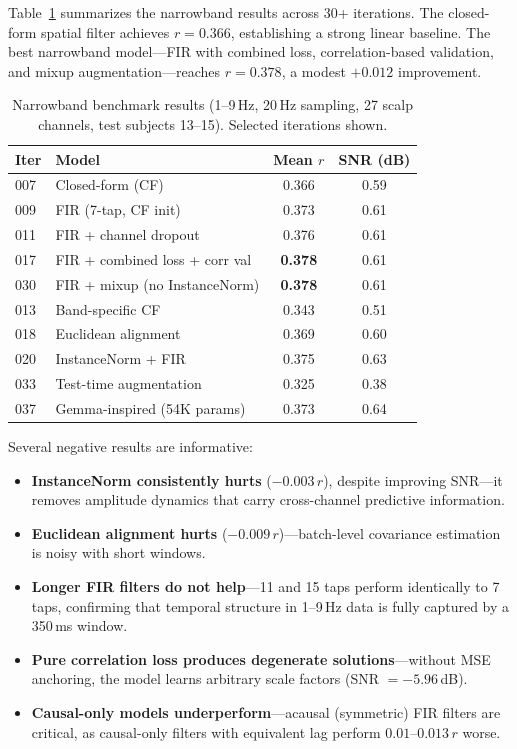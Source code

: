 \documentclass[conference]{IEEEtran}
\begin{document}
Table~\ref{tab:narrowband} summarizes the narrowband results across 30+ iterations. The closed-form spatial filter achieves $r = 0.366$, establishing a strong linear baseline. The best narrowband model---FIR with combined loss, correlation-based validation, and mixup augmentation---reaches $r = 0.378$, a modest $+0.012$ improvement.

\begin{table}[t]
\centering
\caption{Narrowband benchmark results (1--9\,Hz, 20\,Hz sampling, 27 scalp channels, test subjects 13--15). Selected iterations shown.}
\label{tab:narrowband}
\begin{tabular}{@{}llcc@{}}
\toprule
Iter & Model & Mean $r$ & SNR (dB) \\
\midrule
007 & Closed-form (CF) & 0.366 & 0.59 \\
009 & FIR (7-tap, CF init) & 0.373 & 0.61 \\
011 & FIR + channel dropout & 0.376 & 0.61 \\
017 & FIR + combined loss + corr val & \textbf{0.378} & 0.61 \\
030 & FIR + mixup (no InstanceNorm) & \textbf{0.378} & 0.61 \\
\midrule
013 & Band-specific CF & 0.343 & 0.51 \\
018 & Euclidean alignment & 0.369 & 0.60 \\
020 & InstanceNorm + FIR & 0.375 & 0.63 \\
033 & Test-time augmentation & 0.325 & 0.38 \\
037 & Gemma-inspired (54K params) & 0.373 & 0.64 \\
\bottomrule
\end{tabular}
\end{table}

Several negative results are informative:
\begin{itemize}
    \item \textbf{InstanceNorm consistently hurts} ($-0.003\,r$), despite improving SNR---it removes amplitude dynamics that carry cross-channel predictive information.
    \item \textbf{Euclidean alignment hurts} ($-0.009\,r$)---batch-level covariance estimation is noisy with short windows.
    \item \textbf{Longer FIR filters do not help}---11 and 15 taps perform identically to 7 taps, confirming that temporal structure in 1--9\,Hz data is fully captured by a 350\,ms window.
    \item \textbf{Pure correlation loss produces degenerate solutions}---without MSE anchoring, the model learns arbitrary scale factors (SNR $= -5.96$\,dB).
    \item \textbf{Causal-only models underperform}---acausal (symmetric) FIR filters are critical, as causal-only filters with equivalent lag perform $0.01$--$0.013\,r$ worse.
\end{itemize}
\end{document}
